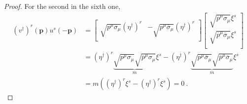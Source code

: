\begin{proof}
        For the second in the sixth one, 
        \begin{equation*}
        \begin{aligned}
            (v^\dagger)^r (\mathbf p) u^s (- \mathbf p) & = \begin{bmatrix}
                \sqrt{p^\mu \sigma_\mu} (\eta^\dagger)^r & - \sqrt{p^\mu \overline \sigma_\mu} (\eta^\dagger)^r \\
            \end{bmatrix} \begin{bmatrix}
                \sqrt{\overline p^\mu \sigma_\mu} \xi^s \\ \sqrt{\overline p^\mu \overline \sigma_\mu} \xi^s \\
            \end{bmatrix} \\ & = (\eta^\dagger)^r \underbrace{\sqrt{p^\mu \sigma_\mu} \sqrt{\overline p^\mu \sigma_\mu}}_m \xi^s - (\eta^\dagger)^r \underbrace{\sqrt{p^\mu \overline \sigma_\mu} \sqrt{\overline p^\mu \overline \sigma_\mu}}_m \xi^s \\ & = m ((\eta^\dagger)^r \xi^s - (\eta^\dagger)^r \xi^s) = 0 ~.
        \end{aligned}
        \end{equation*}
    \end{proof}
    
